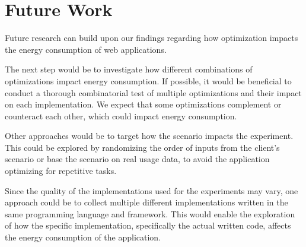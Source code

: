 \documentclass[main.tex]{subfiles}
\begin{document}
\section{Future Work}

Future research can build upon our findings regarding how optimization impacts the energy consumption of web applications.

The next step would be to investigate how different combinations of optimizations impact energy consumption. If possible, it would be beneficial to conduct a thorough combinatorial test of multiple optimizations and their impact on each implementation. We expect that some optimizations complement or counteract each other, which could impact energy consumption.

Other approaches would be to target how the scenario impacts the experiment. This could be explored by randomizing the order of inputs from the client's scenario or base the scenario on real usage data, to avoid the application optimizing for repetitive tasks. 

Since the quality of the implementations used for the experiments may vary, one approach could be to collect multiple different implementations written in the same programming language and framework. This would enable the exploration of how the specific implementation, specifically the actual written code, affects the energy consumption of the application. 
\end{document}

